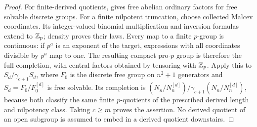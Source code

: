 \begin{proof}
For finite-derived quotients,
\citet[\S3, Theorem~3.1, p.~101; definition p.~91]{Shmelkin1964}
gives free abelian ordinary factors for free solvable discrete
groups. For a finite nilpotent truncation, choose collected Malcev
coordinates. Its integer-valued binomial multiplication and
inversion formulas extend to $\mathbb Z_p$; density proves their laws.
Every map to a finite $p$-group is continuous: if $p^a$ is an
exponent of the target, expressions with all coordinates divisible
by $p^a$ map to one. The resulting compact pro-$p$ group is
therefore the full completion, with central factors obtained by
tensoring with $\mathbb Z_p$. Apply this to $S_d/\gamma_{c+1}S_d$,
where $F_0$ is the discrete free group on $n^2+1$ generators and
$S_d=F_0/F_0^{[d]}$ is free solvable. Its completion is
$(N_n/N_n^{[d]})/\gamma_{c+1}(N_n/N_n^{[d]})$, because both
classify the same finite $p$-quotients of the prescribed derived
length and nilpotency class. Taking $c\ge m$ proves the assertion.
No derived quotient of an open subgroup is assumed to embed in
a derived quotient downstairs.
\end{proof}

